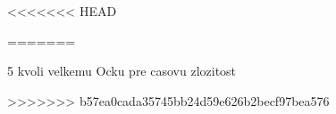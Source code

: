 \newtheorem{theorem}{Veta}
\newtheorem*{define}{Definícia}	%
\newtheorem{note}{Poznámka}

\usepackage{amsfonts} %
\usepackage{listings} %
<<<<<<< HEAD
\usepackage{graphicx}
=======

5 kvoli velkemu Ocku pre casovu zlozitost
\usepackage{amsmath}
\newcommand{\BigO}[1]{\ensuremath{\operatorname{O}\bigl(#1\bigr)}}
>>>>>>> b57ea0cada35745bb24d59e626b2becf97bea576

\newcommand{\N}{\mathbb{N}\,}
\newcommand{\Z}{\mathbb{Z}\,}
\newcommand{\Q}{\mathbb{Q}\,}
\newcommand{\R}{\mathbb{R}\,}
\newcommand{\Ri}{\mathbb{R}^{*}\,}